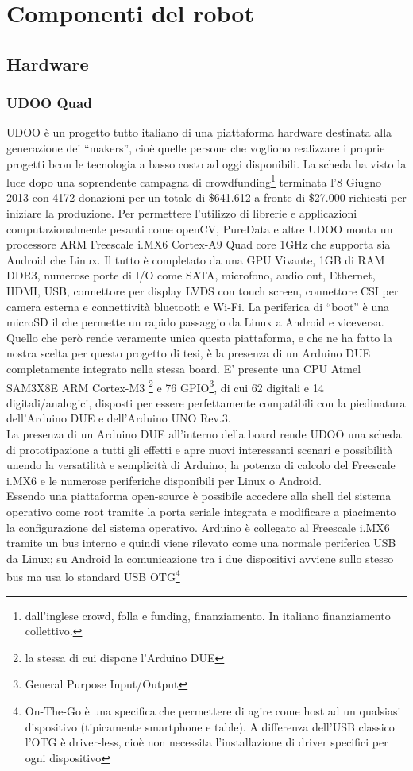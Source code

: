 \chapter{Componenti del robot}
\section{Hardware}
\subsection{UDOO Quad}
UDOO è un progetto tutto italiano di una piattaforma hardware destinata alla generazione dei ``makers'', cioè quelle persone che vogliono realizzare i proprie progetti bcon le tecnologia a basso costo ad oggi disponibili. La scheda ha visto la luce dopo una soprendente campagna di crowdfunding\footnote{dall'inglese crowd, folla e funding, finanziamento. In italiano finanziamento collettivo.} terminata l'8 Giugno 2013 con 4172 donazioni per un totale di \$641.612 a fronte di \$27.000 richiesti per iniziare la produzione. Per permettere l'utilizzo di librerie e applicazioni computazionalmente pesanti come openCV, PureData e altre UDOO monta un processore ARM Freescale i.MX6 Cortex-A9 Quad core 1GHz che supporta sia Android che Linux. Il tutto è completato da una GPU Vivante, 1GB di RAM DDR3, numerose porte di I/O come SATA, microfono, audio out, Ethernet, HDMI, USB, connettore per display LVDS con touch screen, connettore CSI per camera esterna e connettività bluetooth e Wi-Fi. La periferica di ``boot'' è una microSD il che permette un rapido passaggio da Linux a Android e viceversa. Quello che però rende veramente unica questa piattaforma, e che ne ha fatto la nostra scelta per questo progetto di tesi, è la presenza di un Arduino DUE completamente integrato nella stessa board. 
E' presente una CPU Atmel SAM3X8E ARM Cortex-M3 \footnote{la stessa di cui dispone l'Arduino DUE} e 76 GPIO\footnote{General Purpose Input/Output}, di cui 62 digitali e 14 digitali/analogici, disposti per essere perfettamente compatibili con la piedinatura dell'Arduino DUE e dell'Arduino UNO Rev.3. \\
La presenza di un Arduino DUE all'interno della board rende UDOO una scheda di prototipazione a tutti gli effetti e apre nuovi interessanti scenari e possibilità unendo la versatilità e semplicità di Arduino, la potenza di calcolo del Freescale i.MX6 e le numerose periferiche disponibili per Linux o Android.\\
Essendo una piattaforma open-source è possibile accedere alla shell del sistema operativo come root tramite la porta seriale integrata e modificare a piacimento la configurazione del sistema operativo. Arduino è collegato al Freescale i.MX6 tramite un bus interno e quindi viene rilevato come una normale periferica USB da Linux; su Android la comunicazione tra i due dispositivi avviene sullo stesso bus ma usa lo standard USB OTG\footnote{On-The-Go è una specifica che permettere di agire come host ad un qualsiasi  dispositivo (tipicamente smartphone e table). A differenza dell'USB classico l'OTG è driver-less, cioè non necessita l'installazione di driver specifici per ogni dispositivo}


